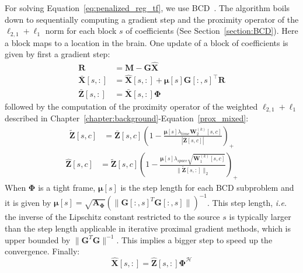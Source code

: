 For solving Equation~\eqref{eq:penalized_reg_tf}, we use BCD~\cite{tseng2010approximation}. The algorithm boils down to sequentially computing a gradient step and the proximity operator of the $\ell_{2,1}+\ell_1$ norm for each block $s$ of coefficients (See Section~\ref{section:BCD}). Here a block maps to a location in the brain. One update of a block of coefficients is given by first a gradient step:
\begin{align} \label{eq:block_update}
    \mathbf{R} &= \mathbf{M} - \mathbf{G}\hat{\mathbf{X}} \\
    \bar{\mathbf{X}}[s,:] &= \hat{\mathbf{X}}[s,:] + \mathbf{\mu}[s]\mathbf{G}[:,s]^\top\mathbf{R} \\
    \bar{\mathbf{Z}}[s,:] &= \bar{\mathbf{X}}[s,:]\mathbf{\Phi}
\end{align}
followed by the computation of the proximity operator of the weighted $\ell_{2,1}+\ell_1$ described in Chapter~\ref{chapter:background}-Equation~\ref{prox_mixed}:
\begin{equation} \label{prox_l1}
\begin{aligned}
    \tilde{\mathbf{Z}}[s,c] &= \bar{\mathbf{Z}}[s,c]\left(1 - \frac{\mathbf{\mu}[s]\lambda_{time}\mathbf{W}_2^{(k)}[s,c]}{|\bar{\mathbf{Z}}[s,c]|} \right)_+
\end{aligned}
\end{equation}
\begin{equation} \label{prox_l21}
\begin{aligned}
    \hat{\mathbf{Z}}[s,c] &= \tilde{\mathbf{Z}}[s,c]\left(1 - \frac{\mathbf{\mu}[s]\lambda_{space}\sqrt{\mathbf{W}_1^{(k)}[s,c]}}{\|\tilde{\mathbf{Z}}[s,:]\|_2}\right)_+
\end{aligned}
\end{equation}
When $\mathbf{\Phi}$ is a tight frame, $\mathbf{\mu}[s]$ is the step length for each BCD subproblem and it is given by $\mathbf{\mu}[s]=\sqrt{\mathbf{A}_{\mathbf{\Phi}}}(\|\mathbf{G}[:,s]^T\mathbf{G}[:,s]\|)^{-1}$. This step length, \textit{i.e.} the inverse of the Lipschitz constant restricted to the source $s$ is typically larger than the step length applicable in iterative proximal gradient methods, which is upper bounded by $\|\mathbf{G}^T\mathbf{G}\|^{-1}$. This implies a bigger step to speed up the convergence.
Finally:
\begin{equation}
    \hat{\mathbf{X}}[s,:] = \hat{\mathbf{Z}}[s,:]\mathbf{\Phi}^\mathcal{H}
\end{equation}

